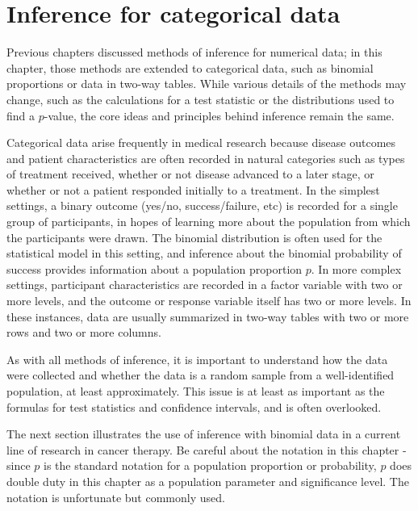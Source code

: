 
\chapter{Inference for categorical data}
\label{inferenceForCategoricalData}



Previous chapters discussed methods of inference for numerical data; in this chapter, those methods are extended to categorical data, such as binomial proportions or data in two-way tables. While various details of the methods may change, such as the calculations for a test statistic or the distributions used to find a $p$-value, the core ideas and principles behind inference remain the same.  

Categorical data arise frequently in medical research because disease outcomes and patient characteristics are often recorded in natural categories such as types of treatment received, whether or not disease advanced to a later stage, or whether or not a patient responded initially to a treatment. In the simplest settings, a binary outcome (yes/no, success/failure, etc)  is recorded for a single group of participants, in hopes of learning more about the population from which the participants were drawn.  The binomial distribution is often used for the statistical model in this setting, and inference about the binomial probability of success provides information about a population proportion $p$.   In more complex settings, participant characteristics are recorded in a factor variable with two or more levels, and the outcome or response variable itself has two or more levels.  In these instances, data are usually summarized in two-way tables with two or more rows and two or more columns.

As with all methods of inference, it is important to understand how the data were collected and whether the data is a random sample from a well-identified population, at least approximately.  This issue is at least as important as the formulas for test statistics and confidence intervals, and is often overlooked.

The next section illustrates the use of inference with binomial data in a current line of research in cancer therapy.  Be careful about the notation in this chapter - since $p$ is the standard notation for a population proportion or probability, $p$ does double duty in this chapter as a population parameter and significance level.  The notation is unfortunate but commonly used.

